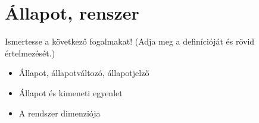 \documentclass[../main.tex]{subfiles}
\begin{document}
\section{Állapot, renszer}

\begin{fulltheorem}
	Ismertesse a következő fogalmakat!
	(Adja meg a definícióját és rövid értelmezését.)
	\begin{itemize}
		\item Állapot, állapotváltozó, állapotjelző
		\item Állapot és kimeneti egyenlet
		\item A rendszer dimenziója
	\end{itemize}
\end{fulltheorem}
\end{document}
